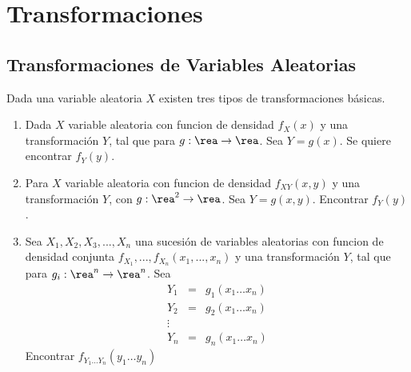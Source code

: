 %
%
\chapter{Transformaciones}

%
\section{Transformaciones de Variables Aleatorias}
Dada una variable aleatoria $X$ existen tres tipos de transformaciones b\'asicas.
\begin{enumerate}
\item Dada $X$ variable aleatoria con funcion de densidad $f_{X}\left(x\right)$ y una transformaci\'on $Y$, tal que para $g:\rea\rightarrow\rea$. Sea $Y=g\left(x\right)$. Se quiere encontrar $f_{Y}\left(y\right)$.
\item Para $X$ variable aleatoria con funcion de densidad $f_{XY}\left(x,y\right)$ y una transformaci\'on $Y$, con $g:\rea^2\rightarrow\rea$. Sea $Y=g\left(x,y\right)$. Encontrar $f_{Y}\left(y\right)$.
\item Sea $X_{1}, X_{2}, X_{3},..., X_{n}$ una sucesi\'on de variables aleatorias con funcion de densidad conjunta $f_{X_{1}},...,f_{X_{n}} \left(x_{1},...,x_{n}\right)$ y una transformaci\'on $Y$, tal que para $g_{i}:\rea^n\rightarrow\rea^n$. Sea 
\begin{eqnarray*}
Y_{1}&=&g_{1}\left(x_{1}\ldots x_{n}\right) \\ 
Y_{2}&=&g_{2}\left(x_{1}\ldots x_{n}\right)\\ 
\vdots \\ 
Y_{n}&=&g_{n}\left(x_{1}\ldots x_{n}\right)
\end{eqnarray*}
Encontrar $f_{Y_{1}\ldots Y_{n}}\left(y_{1} \ldots y_{n}\right)$
\end{enumerate}
